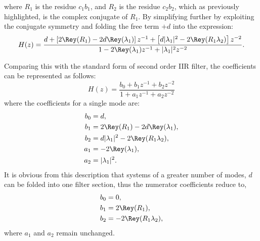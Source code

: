 where $R_1$ is the residue $c_1 b_1$, and $R_2$ is the residue $c_2 b_2$, which as previously highlighted, is the complex conjugate of $R_1$.
By simplifying further by exploiting the conjugate symmetry and folding the free term $+d$ into the expression:
\begin{equation}
\label{eq:full-parallel}
    H(z) = \frac{d + \left[2\Rey(R_1) - 2d\Rey(\lambda_1)\right]z^{-1} + \left[d|\lambda_1|^2 - 2\Rey(R_1\lambda_2)\right]z^{-2}}{1 - 2\Rey(\lambda_1)z^{-1} + |\lambda_1|^2 z^{-2}}.
\end{equation}

Comparing this with the standard form of second order IIR filter, the coefficients can be represented as follows:
\begin{equation}
\label{eq:iir-filter}
H(z) = \frac{b_0 + b_1 z^{-1} + b_2 z^{-2}}{1 + a_1 z^{-1} + a_2 z^{-2}}
\end{equation}
where the coefficients for a single mode are:
\begin{subequations}
\label{eq:biquad-coeffs}
\begin{align}
    b_0 &= d, \\
    b_1 &= 2\Rey(R_1) - 2d\Rey(\lambda_1), \\
    b_2 &= d|\lambda_1|^2 - 2\Rey(R_1\lambda_2), \\
    a_1 &= -2\Rey(\lambda_1), \\
    a_2 &= |\lambda_1|^2.
\end{align}
\end{subequations}
It is obvious from this description that systems of a greater number of modes, $d$ can be folded into one filter section, thus the numerator coefficients reduce to,
\begin{subequations}
\label{eq:biquad-coeffs-2}
\begin{align}
    b_0 &= 0, \\
    b_1 &= 2\Rey(R_1), \\
    b_2 &= -2\Rey(R_1\lambda_2), \\
\end{align}
\end{subequations}
where $a_1$ and $a_2$ remain unchanged.